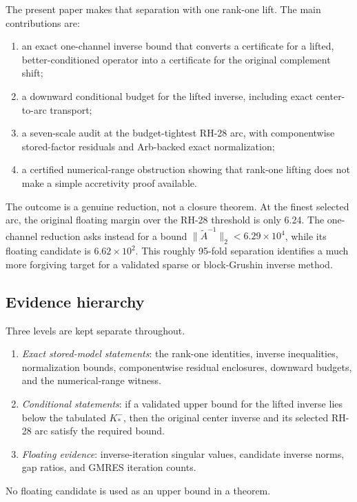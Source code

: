 \documentclass[11pt]{article}
\theoremstyle{definition}
\theoremstyle{remark}
\newcommand{\Atilde}{\widetilde A}
\begin{document}
The present paper makes that separation with one rank-one lift.  The main
contributions are:
\begin{enumerate}
 \item an exact one-channel inverse bound that converts a certificate for a
       lifted, better-conditioned operator into a certificate for the
       original complement shift;
 \item a downward conditional budget for the lifted inverse, including
       exact center-to-arc transport;
 \item a seven-scale audit at the budget-tightest RH-28 arc, with
       componentwise stored-factor residuals and Arb-backed exact
       normalization;
 \item a certified numerical-range obstruction showing that rank-one
       lifting does not make a simple accretivity proof available.
\end{enumerate}

The outcome is a genuine reduction, not a closure theorem.  At the finest
selected arc, the original floating margin over the RH-28 threshold is only
6.24.  The one-channel reduction asks instead for a bound
$\|\Atilde^{-1}\|_2<6.29\times10^4$, while its floating candidate is
$6.62\times10^2$.  This roughly 95-fold separation identifies a much more
forgiving target for a validated sparse or block-Grushin inverse method.

\subsection{Evidence hierarchy}

Three levels are kept separate throughout.
\begin{enumerate}
 \item \emph{Exact stored-model statements}: the rank-one identities,
       inverse inequalities, normalization bounds, componentwise residual
       enclosures, downward budgets, and the numerical-range witness.
 \item \emph{Conditional statements}: if a validated upper bound for the
       lifted inverse lies below the tabulated $K_*^-$, then the original
       center inverse and its selected RH-28 arc satisfy the required bound.
 \item \emph{Floating evidence}: inverse-iteration singular values,
       candidate inverse norms, gap ratios, and GMRES iteration counts.
\end{enumerate}
No floating candidate is used as an upper bound in a theorem.
\end{document}
